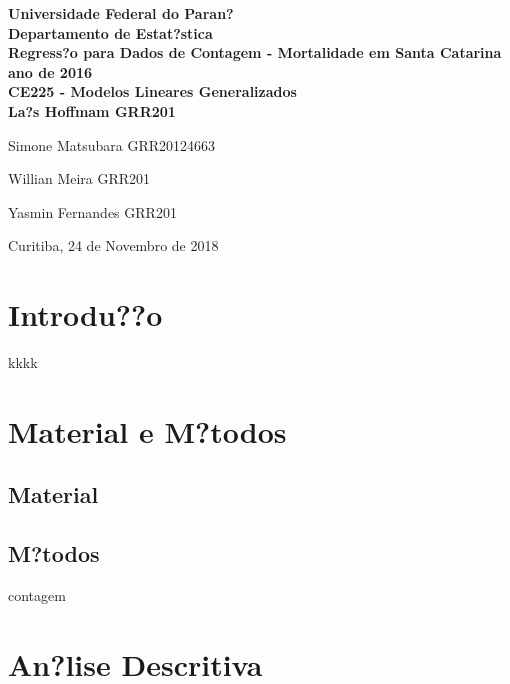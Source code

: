 \documentclass[a4paper]{article} %
\begin{document}

\begin{titlepage}

  \center{\rule{15cm}{2pt}}
  \begin{center}{\bf Universidade Federal do Paran?\\
      Departamento de Estat?stica\\[8cm]

      {\large
        Regress?o para Dados de Contagem - Mortalidade em Santa Catarina ano de 2016}\\[2cm]

      { CE225 - Modelos Lineares Generalizados}\\[5cm]

      { La?s Hoffmam GRR201}
      
      { Simone Matsubara GRR20124663}
      
      { Willian Meira GRR201}

      { Yasmin Fernandes GRR201}

      \vfill
      Curitiba, 24 de Novembro de 2018
      \center{\rule{15cm}{2pt}}}
  \end{center}
\end{titlepage}

\tableofcontents
\pagebreak

\section{Introdu??o}

kkkk


\section{Material e M?todos}
\subsection{Material}




\subsection{M?todos}

contagem

\section{An?lise Descritiva}
\end{document}
